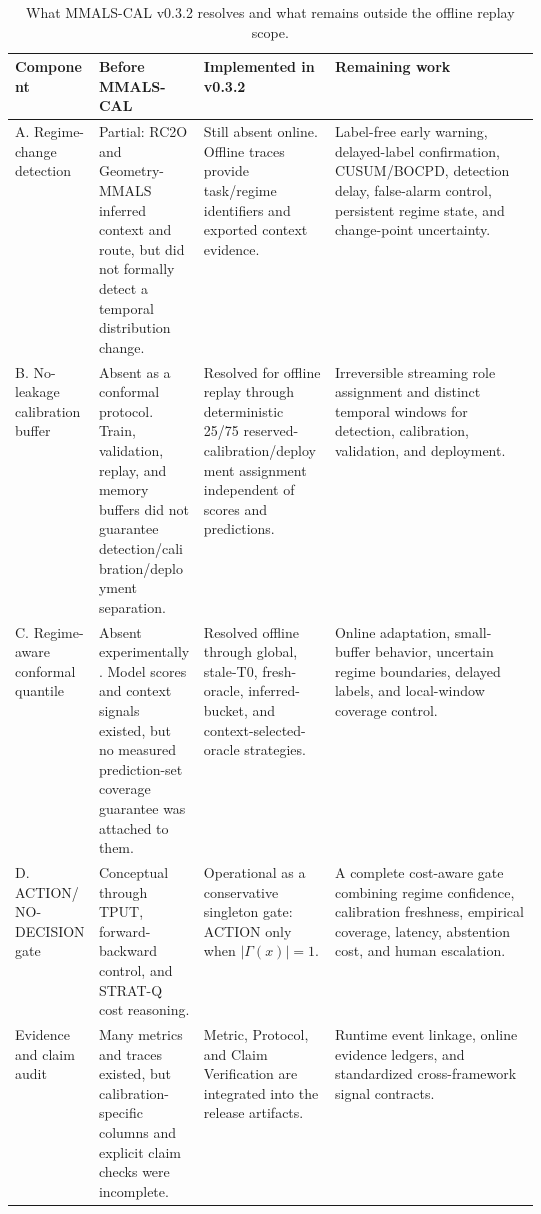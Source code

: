 \begin{table}[H]
\centering\small
\begin{tabularx}{\linewidth}{p{0.16\linewidth} p{0.20\linewidth} p{0.25\linewidth} X}
\toprule
Component & Before MMALS-CAL & Implemented in v0.3.2 & Remaining work\\
\midrule
A. Regime-change detection & Partial: RC2O and Geometry-MMALS inferred context and route, but did not formally detect a temporal distribution change. & Still absent online. Offline traces provide task/regime identifiers and exported context evidence. & Label-free early warning, delayed-label confirmation, CUSUM/BOCPD, detection delay, false-alarm control, persistent regime state, and change-point uncertainty.\\
B. No-leakage calibration buffer & Absent as a conformal protocol. Train, validation, replay, and memory buffers did not guarantee detection/calibration/deployment separation. & Resolved for offline replay through deterministic 25/75 reserved-calibration/deployment assignment independent of scores and predictions. & Irreversible streaming role assignment and distinct temporal windows for detection, calibration, validation, and deployment.\\
C. Regime-aware conformal quantile & Absent experimentally. Model scores and context signals existed, but no measured prediction-set coverage guarantee was attached to them. & Resolved offline through global, stale-T0, fresh-oracle, inferred-bucket, and context-selected-oracle strategies. & Online adaptation, small-buffer behavior, uncertain regime boundaries, delayed labels, and local-window coverage control.\\
D. ACTION/NO-DECISION gate & Conceptual through TPUT, forward-backward control, and STRAT-Q cost reasoning. & Operational as a conservative singleton gate: ACTION only when $|\Gamma(x)|=1$. & A complete cost-aware gate combining regime confidence, calibration freshness, empirical coverage, latency, abstention cost, and human escalation.\\
Evidence and claim audit & Many metrics and traces existed, but calibration-specific columns and explicit claim checks were incomplete. & Metric, Protocol, and Claim Verification are integrated into the release artifacts. & Runtime event linkage, online evidence ledgers, and standardized cross-framework signal contracts.\\
\bottomrule
\end{tabularx}
\caption{What MMALS-CAL v0.3.2 resolves and what remains outside the offline replay scope.}
\end{table}

